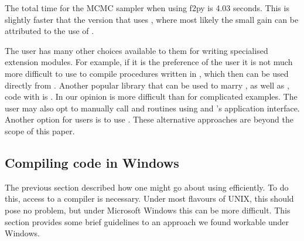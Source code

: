 \documentclass[article]{jss}
\begin{document}
The total time for the MCMC sampler when using f2py is 4.03 seconds.
This is slightly faster that the version that uses , where most
likely the small gain can be attributed to the use of .

The user has many other choices available to them for writing
specialised extension modules. For example, if it is the preference of
the user it is not much more difficult to use  to compile
procedures written in , which then can be used directly
from . Another popular library that can be used to
marry , as well as , code with
 is . In our opinion  is more
difficult than  for complicated examples. The user may also
opt to manually call  and  routines using
 and 's  application
interface. Another option for  users is to use
 . These alternative approaches are beyond
the scope of this paper.


\subsection{Compiling code in Windows}
\label{CompilingWindows}

The previous section described how one might go about using
 efficiently. To do this, access to a compiler is
necessary. Under most flavours of UNIX, this should pose no problem,
but under Microsoft Windows this can be more difficult. This section
provides some brief guidelines to an approach we found workable under
Windows.
\end{document}
